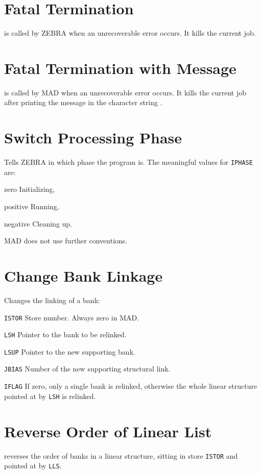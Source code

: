 \section{Fatal Termination}
\label{ZFATAL}
is called by ZEBRA when an unrecoverable error occurs.
It kills the current job.

\section{Fatal Termination with Message}
\label{ZFATAM}
is called by MAD when an unrecoverable error occurs.
It kills the current job after printing the message in the character
string .

\section{Switch Processing Phase}
\label{ZPHASE}
Tells ZEBRA in which phase the program is.
The meaningful values for {\tt IPHASE} are:
\begin{mylist}
\item{zero}
    Initializing,
\item{positive}
    Running,
\item{negative}
    Cleaning up.
\end{mylist}
MAD does not use further conventions.

\section{Change Bank Linkage}
\label{ZSHUNT}
Changes the linking of a bank:
\begin{mylist}
\item[\tt ISTOR]
    Store number. Always zero in MAD.
\item[\tt LSH]
    Pointer to the bank to be relinked.
\item[\tt LSUP]
    Pointer to the new supporting bank.
\item[\tt JBIAS]
    Number of the new supporting structural link.
\item[\tt IFLAG]
    If zero, only a single bank is relinked, otherwise the whole
    linear structure pointed at by {\tt LSH} is relinked.
\end{mylist}

\section{Reverse Order of Linear List}
\label{ZTOPSY}
reverses the order of banks in a linear structure, sitting in store
{\tt ISTOR} and pointed at by {\tt LLS}.


